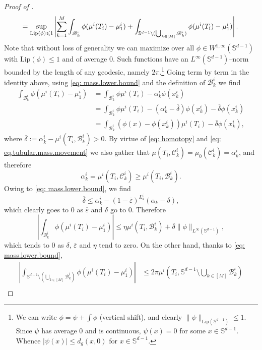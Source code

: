 \documentclass[a4paper,11pt]{article}
\theoremstyle{plain}
\renewcommand{\S}{\mathbb{S}^{d-1}}
\renewcommand{\leq}{\leqslant}
\renewcommand{\geq}{\geqslant}
\numberwithin{equation}{section}
\begin{document}
\begin{proof}[Proof of ]
\begin{align*}
    &\hspace{0.2cm}= \sup_{\mathrm{Lip}(\phi)\leq 1}\left|\sum_{k=1}^M\int_{\mathscr{B}_k^i}\phi(\mu^i(T_i)- \mu_1^i)+\int_{\S\setminus(\bigcup_{k\in[M]}\mathscr{B}_k^i)}\phi(\mu^i(T_i)-\mu_1^i)\right|.
\end{align*}
Note that without loss of generality we can maximize over all $\phi\in W^{1,\infty}(\S)$ with $\mathrm{Lip}(\phi)\leq1$ and of average $0$. Such functions have an $L^\infty(\S)$--norm bounded by the length of any geodesic, namely $2\pi$.\footnote{We can write $\phi=\psi+\int\phi$ (vertical shift), and clearly $\|\psi\|_{\mathrm{Lip}(\S)}\leq1$. Since $\psi$ has average $0$ and is continuous, $\psi(x)=0$ for some $x\in\S$. Whence $|\psi(x)|\leq d_g(x,0)$ for $x\in\S$.} 
Going term by term in the identity above, using \eqref{eq: mass.lower.bound} and the definition of $\mathscr{B}_k^i$ we find
\begin{align*}
\int_{\mathscr{B}_k^i} \phi(\mu^i(T_i) -\mu_1^i)&=
    \int_{\mathscr{B}_k^i} \phi\mu^i(T_i) -\alpha_k^i\phi(x_k^i)\\
    &=\int_{\mathscr{B}_k^i} \phi\mu^i(T_i) -(\alpha_k^i-\overline{\delta})\phi(x_k^i)-\overline{\delta}\phi(x_k^i)\\
    &=\int_{\mathscr{B}_k^i} (\phi(x)-\phi(x_k^i))\mu^i(T_i) -\overline{\delta}\phi(x_k^i),
\end{align*}
where $\overline{\delta}:=\alpha_k^i-\mu^i(T_i,\mathscr{B}_k^i)>0$. 
By virtue of \eqref{eq: homotopy} and \eqref{eq: eq.tubular.mass.movement} we also gather that $\mu(T_i,\mathscr{C}_k^i)=\mu_0(\mathscr{C}_k^i)=\alpha_k^i$, and therefore 
$$\alpha_k^i=\mu^i(T_i,\mathscr{C}_k^i)\geq \mu^i(T_i,\mathscr{B}_k^i).$$
Owing to \eqref{eq: mass.lower.bound}, we find
\begin{equation*}
    \overline{\delta}\leq \alpha_k^i-(1-\overline{\varepsilon})^{L_k^i}(\alpha_k-\delta),
\end{equation*}
which clearly goes to $0$ as $\overline{\varepsilon}$ and $\delta$ go to $0$. Therefore
\begin{equation*}
    \left|\int_{\mathscr{B}_k^i} \phi(\mu^i(T_i) -\mu_1^i)\right|\leq \eta \mu^i(T_i,\mathscr{B}_k^i)+\overline{\delta}\|\phi\|_{L^\infty(\S)},
\end{equation*}
which tends to $0$ as $\delta$, $\overline{\varepsilon}$ and $\eta$ tend to zero. On the other hand, thanks to \eqref{eq: mass.lower.bound},
\begin{align*}
\left|\int_{\S\setminus(\bigcup_{k\in[M]}\mathscr{B}_k^i)}\phi(\mu^i(T_i)-\mu_1^i)\right|&\leq 2\pi \mu^i\left(T_i,\S\setminus\bigcup_{k\in[M]} \mathscr{B}_k^i\right)\\

\end{align*}
\end{proof}
\end{document}
